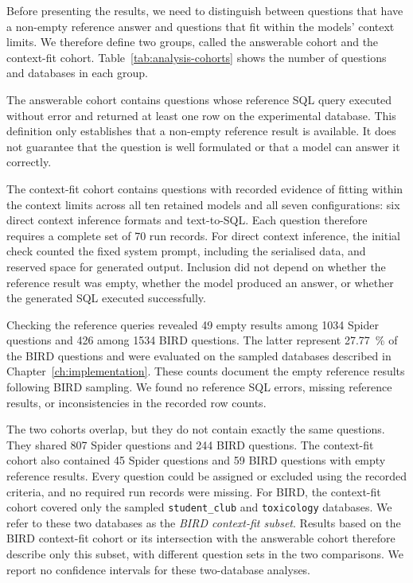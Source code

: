 Before presenting the results, we need to distinguish between questions that have a non-empty reference
answer and questions that fit within the models' context limits. We therefore define two groups, called the
answerable cohort and the context-fit cohort. Table~\ref{tab:analysis-cohorts} shows the number of questions
and databases in each group.

The answerable cohort contains questions whose reference SQL query executed without error and returned at
least one row on the experimental database. This definition only establishes that a non-empty reference
result is available. It does not guarantee that the question is well formulated or that a model can answer it correctly.

The context-fit cohort contains questions with recorded evidence of fitting within the context limits across
all ten retained models and all seven configurations: six direct context inference formats and text-to-SQL.
Each question therefore requires a complete set of \num{70} run records. For direct context inference, the
initial check counted the fixed system prompt, including the serialised data, and reserved space for
generated output. Inclusion did not depend on whether the reference result was empty, whether the model
produced an answer, or whether the generated SQL executed successfully.



Checking the reference queries revealed \num{49} empty results among \num{1034} Spider questions and
\num{426} among \num{1534} BIRD questions. The latter represent \qty{27.77}{\percent} of the BIRD questions
and were evaluated on the sampled databases described in Chapter~\ref{ch:implementation}. These counts
document the empty reference results following BIRD sampling. We found no reference SQL errors, missing
reference results, or inconsistencies in the recorded row counts.

The two cohorts overlap, but they do not contain exactly the same questions. They shared \num{807} Spider
questions and \num{244} BIRD questions. The context-fit cohort also contained \num{45} Spider questions and
\num{59} BIRD questions with empty reference results. Every question could be assigned or excluded using the
recorded criteria, and no required run records were missing. For BIRD, the context-fit cohort covered only
the sampled \texttt{student\_club} and \texttt{toxicology} databases. We refer to these two databases as the
\emph{BIRD context-fit subset}. Results based on the BIRD context-fit cohort or its intersection with the
answerable cohort therefore describe only this subset, with different question sets in the two comparisons.
We report no confidence intervals for these two-database analyses.

